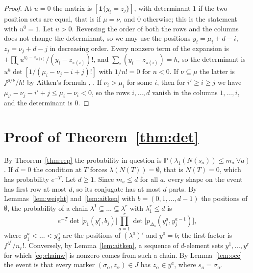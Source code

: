 \documentclass[11pt]{amsart}
\theoremstyle{remark}
\numberwithin{equation}{section}
\newcommand{\Pp}{\mathbb P}
\begin{document}
\begin{proof}
At $u=0$ the matrix is $[\mathbf 1\{y_i=z_j\}]$, with determinant $1$ if the two position sets are equal, that is if $\mu=\nu$, and $0$ otherwise; this is the statement with $u^0=1$. Let $u>0$. Reversing the order of both the rows and the columns does not change the determinant, so we may use the positions $y_i=\mu_i+d-i$, $z_j=\nu_j+d-j$ in decreasing order. Every nonzero term of the expansion is $\pm\prod_iu^{y_i-z_{\pi(i)}}/(y_i-z_{\pi(i)})!$, and $\sum_i(y_i-z_{\pi(i)})=h$, so the determinant is $u^h\det[1/(\mu_i-\nu_j-i+j)!]$ with $1/n!=0$ for $n<0$. If $\nu\subseteq\mu$ the latter is $f^{\mu/\nu}/h!$ by Aitken's formula \cite{Ait43}, \cite[Section~7.16]{Sta99}. If $\nu_i>\mu_i$ for some $i$, then for $i'\ge i\ge j$ we have $\mu_{i'}-\nu_j-i'+j\le\mu_i-\nu_i<0$, so the rows $i,\dots,d$ vanish in the columns $1,\dots,i$, and the determinant is $0$.
\end{proof}

\section{Proof of Theorem~\ref{thm:det}}\label{sec:det}

By Theorem~\ref{thm:rep} the probability in question is $\Pp(\lambda_1(N(s_a))\le m_a\ \forall a)$. If $d=0$ the condition at $T$ forces $\lambda(N(T))=\emptyset$, that is $N(T)=0$, which has probability $e^{-T}$. Let $d\ge1$. Since $m_a\le d$ for all $a$, every shape on the event has first row at most $d$, so its conjugate has at most $d$ parts. By Lemmas~\ref{lem:weight} and~\ref{lem:aitken} with $b=(0,1,\dots,d-1)$ the positions of $\emptyset$, the probability of a chain $\lambda^1\subseteq\dots\subseteq\lambda^r$ with $\lambda_1^r\le d$ is
\begin{equation}\label{eq:chainw}
e^{-T}\det\bigl[p_1(y^r_i,b_j)\bigr]\prod_{a=1}^r\det\bigl[p_{\Delta_a}(y^a_i,y^{a-1}_j)\bigr],
\end{equation}
where $y^a_1<\dots<y^a_d$ are the positions of $(\lambda^a)'$ and $y^0=b$; the first factor is $f^{\lambda^r}/n_r!$. Conversely, by Lemma~\ref{lem:aitken}, a sequence of $d$-element sets $y^1,\dots,y^r$ for which \eqref{eq:chainw} is nonzero comes from such a chain. By Lemma~\ref{lem:occ} the event is that every marker $(\sigma_\alpha,z_\alpha)\in J$ has $z_\alpha\in y^{a}$, where $s_a=\sigma_\alpha$.
\end{document}
